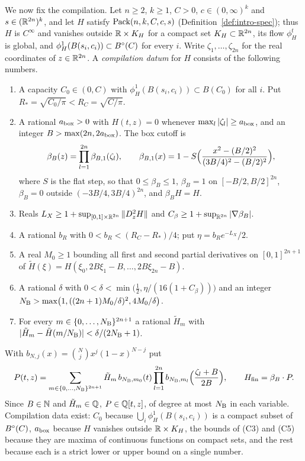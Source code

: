 We now fix the compilation. Let $n\ge2$, $k\ge1$, $C>0$, $c\in(0,\infty)^k$ and $s\in(\mathbb{R}^{2n})^k$, and let $H$
satisfy $\mathrm{Pack}(n,k,C,c,s)$ (Definition~\ref{def:intro-spec}); thus $H$ is $C^\infty$ and vanishes outside
$\mathbb{R}\times K_H$ for a compact set $K_H\subset\mathbb{R}^{2n}$, its flow $\phi^t_H$ is global, and
$\phi^1_H(B(s_i,c_i))\subset B^{\circ}(C)$ for every $i$. Write $\zeta_1,\dots,\zeta_{2n}$ for the real coordinates of
$z\in\mathbb{R}^{2n}$. A \emph{compilation datum} for $H$ consists of the following numbers.
\begin{enumerate}[label=(C\arabic*)]
\item A capacity $C_0\in(0,C)$ with $\phi^1_H(B(s_i,c_i))\subset B(C_0)$ for all $i$. Put
 $R_*=\sqrt{C_0/\pi}<R_C=\sqrt{C/\pi}$.
\item A rational $a_{\rm box}>0$ with $H(t,z)=0$ whenever $\max_l|\zeta_l|\ge a_{\rm box}$, and an integer
 $B>\max(2n,2a_{\rm box})$. The box cutoff is
 \[
 \beta_B(z)=\prod_{l=1}^{2n}\beta_{B,1}(\zeta_l),\qquad
 \beta_{B,1}(x)=1-S\Bigl(\frac{x^2-(B/2)^2}{(3B/4)^2-(B/2)^2}\Bigr),
 \]
 where $S$ is the flat step, so that $0\le\beta_B\le1$, $\beta_B=1$ on $[-B/2,B/2]^{2n}$, $\beta_B=0$ outside
 $(-3B/4,3B/4)^{2n}$, and $\beta_BH=H$.
\item Reals $L_X\ge1+\sup_{[0,1]\times\mathbb{R}^{2n}}\|D^2_zH\|$ and $C_\beta\ge1+\sup_{\mathbb{R}^{2n}}|\nabla\beta_B|$.
\item A rational $b_R$ with $0<b_R<(R_C-R_*)/4$; put $\eta=b_Re^{-L_X}/2$.
\item A real $M_0\ge1$ bounding all first and second partial derivatives on $[0,1]^{2n+1}$ of
 $\tilde H(\xi)=H(\xi_0,2B\xi_1-B,\dots,2B\xi_{2n}-B)$.
\item A rational $\delta$ with $0<\delta<\min\bigl(\tfrac12,\eta/(16(1+C_\beta))\bigr)$ and an integer
 $N_{\rm B}>\max\bigl(1,((2n+1)M_0/\delta)^2,4M_0/\delta\bigr)$.
\item For every $m\in\{0,\dots,N_{\rm B}\}^{2n+1}$ a rational $\tilde H_m$ with
 $|\tilde H_m-\tilde H(m/N_{\rm B})|<\delta/(2N_{\rm B}+1)$.
\end{enumerate}
With $b_{N,j}(x)=\binom Njx^j(1-x)^{N-j}$ put
\[
 P(t,z)=\sum_{m\in\{0,\dots,N_{\rm B}\}^{2n+1}}\tilde H_m\,b_{N_{\rm B},m_0}(t)\prod_{l=1}^{2n}b_{N_{\rm B},m_l}\Bigl(\frac{\zeta_l+B}{2B}\Bigr),
 \qquad H_{\mathrm{fin}}=\beta_B\cdot P.
\]
Since $B\in\mathbb{N}$ and $\tilde H_m\in\mathbb{Q}$, $P\in\mathbb{Q}[t,z]$, of degree at most $N_{\rm B}$ in each variable. Compilation
data exist: $C_0$ because $\bigcup_i\phi^1_H(B(s_i,c_i))$ is a compact subset of $B^{\circ}(C)$, $a_{\rm box}$ because $H$
vanishes outside $\mathbb{R}\times K_H$, the bounds of (C3) and (C5) because they are maxima of continuous functions on
compact sets, and the rest because each is a strict lower or upper bound on a single number.

